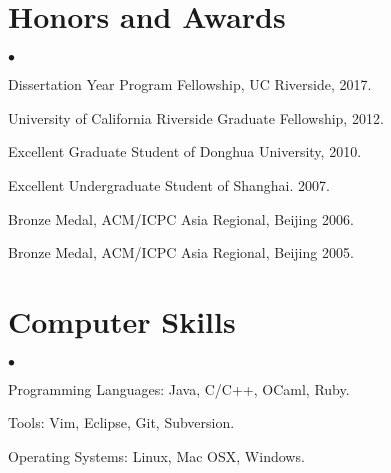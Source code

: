 \documentclass[margin,line]{res}
\newenvironment{list2}{
  \begin{list}{$\bullet$}{%
      \setlength{\itemsep}{0in}
      \setlength{\parsep}{0in} \setlength{\parskip}{0in}
      \setlength{\topsep}{0in} \setlength{\partopsep}{0in} 
      \setlength{\leftmargin}{0.2in}}}{\end{list}}
\begin{document}
\begin{resume}
\section{\sc Honors and Awards} 
\begin{list2}
\item Dissertation Year Program Fellowship, UC Riverside, 2017.
\item University of California Riverside Graduate Fellowship, 2012.
\item Excellent Graduate Student of Donghua University, 2010.
\item Excellent Undergraduate Student of Shanghai. 2007.
\item Bronze Medal, ACM/ICPC Asia Regional, Beijing 2006.
\item Bronze Medal, ACM/ICPC Asia Regional, Beijing 2005.
\end{list2}


\section{\sc Computer Skills} 
\begin{list2}
\item Programming Languages: Java, C/C++, OCaml, Ruby.
\item Tools: Vim, Eclipse, Git, Subversion.
\item Operating Systems: Linux, Mac OSX, Windows.
\end{list2}



\end{resume}
\end{document}
